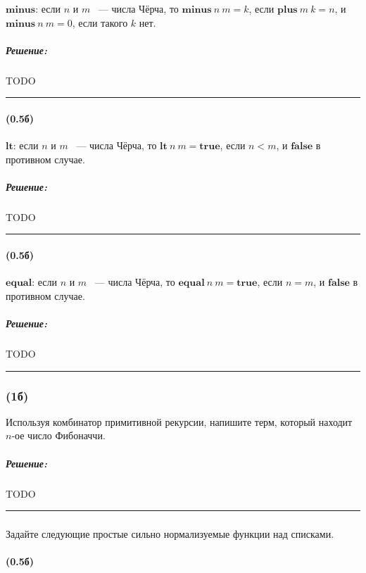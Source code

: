 \documentclass{article}
\newenvironment{proof}{\subparagraph{\hspace{-1em}Решение:\newline}}{\par\noindent\rule{\textwidth}{0.4pt}}
\newcommand{\term}[1]{\mathbf{#1}}
\begin{document}
    $\term{minus}$: если $n$ и $m$ ~--- числа Чёрча, то $\term{minus}~n~m = k$,
    если $\term{plus}~m~k = n$, и $\term{minus}~n~m = 0$, если такого $k$
    нет.

    \begin{proof}
        TODO %
    \end{proof}

    \paragraph{(0.5б)}

    $\term{lt}$: если $n$ и $m$ ~--- числа Чёрча, то $\term{lt}~n~m = \term{true}$, если $n < m$, и $\term{false}$ в противном случае.

    \begin{proof}
        TODO %
    \end{proof}

    \paragraph{(0.5б)}

    $\term{equal}$: если $n$ и $m$ ~--- числа Чёрча, то $\term{equal}~n~m = \term{true}$, если $n = m$, и $\term{false}$ в противном случае.

    \begin{proof}
        TODO %
    \end{proof}

    \subsubsection{(1б)}

    Используя комбинатор примитивной рекурсии, напишите терм, который
    находит $n$-ое число Фибоначчи.

    \begin{proof}
        TODO %
    \end{proof}

    \subsubsection{}

    Задайте следующие простые сильно нормализуемые функции над списками.

    \paragraph{(0.5б)}
\end{document}
